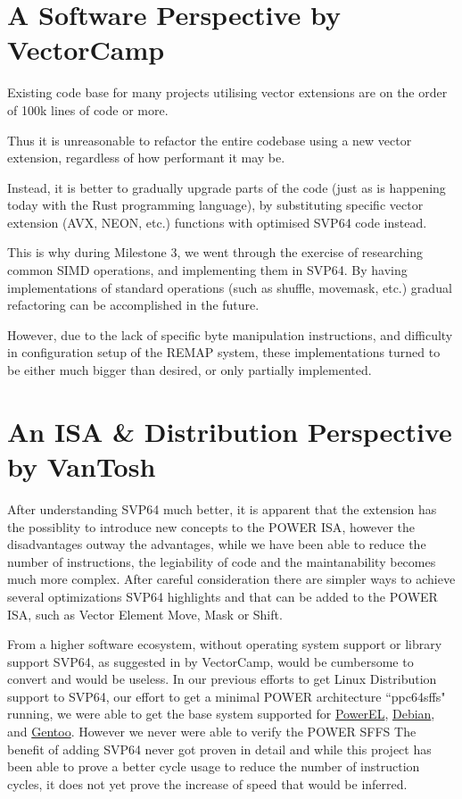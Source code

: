 \section{A Software Perspective by VectorCamp}
\label{sec:vecotorscansoftwareperspective}

Existing code base for many projects utilising vector extensions are on the
order of 100k lines of code or more.

Thus it is unreasonable to refactor the entire codebase using a new vector
extension, regardless of how performant it may be.

Instead, it is better to gradually upgrade parts of the code (just as is
happening today with the Rust programming language), by substituting specific
vector extension (AVX, NEON, etc.) functions with optimised SVP64 code instead.

This is why during Milestone 3, we went through the exercise of researching
common SIMD operations, and implementing them in SVP64. By having
implementations of standard operations (such as shuffle, movemask, etc.)
gradual refactoring can be accomplished in the future.

However, due to the lack of specific byte manipulation instructions, and
difficulty in configuration setup of the REMAP system, these implementations
turned to be either much bigger than desired, or only partially implemented.


\section{An ISA \& Distribution Perspective by VanTosh}

After understanding SVP64 much better, it is apparent that the extension has
the possiblity to introduce new concepts to the \acrshort{POWER} \acrshort{ISA},
however the disadvantages outway the advantages, while we have been able to
reduce the number of instructions, the legiability of code and the maintanability
becomes much more complex.
After careful consideration there are simpler ways to achieve several optimizations
SVP64 highlights and that can be added to the \acrshort{POWER} \acrshort{ISA},
such as Vector Element Move, Mask or Shift.

From a higher software ecosystem, without operating system support or library support
SVP64, as suggested in \label{sec:vecotorscansoftwareperspective} by VectorCamp,
would be cumbersome to convert and would be useless.
In our previous efforts to get Linux Distribution support to SVP64, our effort to
get a minimal \acrshort{POWER} architecture ``ppc64sffs" running, we were able
to get the base system supported for \href{https://www.powerel.org}{PowerEL},
\href{https://www.debian.org}{Debian}, and \href{https://gentoo.org}{Gentoo}.
However we never were able to verify the \acrshort{POWER} \acrfull{SFFS}
The benefit of adding SVP64 never got proven in detail and while this project
has been able to prove a better cycle usage to reduce the number of instruction
cycles, it does not yet prove the increase of speed that would be inferred.

